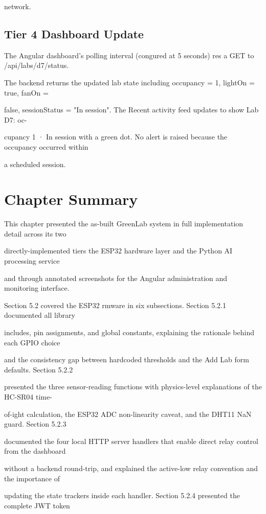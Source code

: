 network.


\subsection{Tier 4  Dashboard Update}
The Angular dashboard's polling interval (congured at 5 seconds) res a GET to /api/labs/d7/status.

The backend returns the updated lab state including occupancy = 1, lightOn = true, fanOn =

false, sessionStatus = "In session". The Recent activity feed updates to show Lab D7: oc-

cupancy 1 · In session with a green dot. No alert is raised because the occupancy occurred within

a scheduled session.





\section{Chapter Summary}
This chapter presented the as-built GreenLab system in full implementation detail across its two

directly-implemented tiers  the ESP32 hardware layer and the Python AI processing service

and through annotated screenshots for the Angular administration and monitoring interface.

Section 5.2 covered the ESP32 rmware in six subsections. Section 5.2.1 documented all library

includes, pin assignments, and global constants, explaining the rationale behind each GPIO choice

and the consistency gap between hardcoded thresholds and the Add Lab form defaults. Section 5.2.2

presented the three sensor-reading functions with physics-level explanations of the HC-SR04 time-

of-ight calculation, the ESP32 ADC non-linearity caveat, and the DHT11 NaN guard. Section 5.2.3

documented the four local HTTP server handlers that enable direct relay control from the dashboard

without a backend round-trip, and explained the active-low relay convention and the importance of

updating the state trackers inside each handler. Section 5.2.4 presented the complete JWT token

